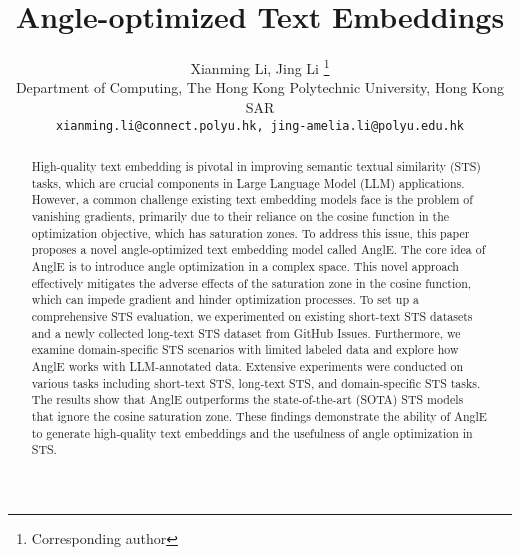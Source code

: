 \documentclass{article} \usepackage{iclr2024_conference,times}
\title{Angle-optimized Text Embeddings}
\author{Xianming Li, Jing Li \thanks{Corresponding author} \\
Department of Computing, The Hong Kong Polytechnic University, Hong Kong SAR \\
\texttt{xianming.li@connect.polyu.hk, jing-amelia.li@polyu.edu.hk}
}
\begin{document}
\maketitle

\begin{abstract}
High-quality text embedding is pivotal in improving semantic textual similarity (STS) tasks, which are crucial components in Large Language Model (LLM) applications. 
However, a common challenge existing text embedding models face is the problem of vanishing gradients, primarily due to their reliance on the cosine function in the optimization objective, which has saturation zones. 
To address this issue, this paper proposes a novel angle-optimized text embedding model called AnglE.
The core idea of AnglE is to introduce angle optimization in a complex space. This novel approach effectively mitigates the adverse effects of the saturation zone in the cosine function, which can impede gradient and hinder optimization processes. 
To set up a comprehensive STS evaluation, we experimented on existing short-text STS datasets and a newly collected long-text STS dataset from GitHub Issues. 
Furthermore, we examine domain-specific STS scenarios with limited labeled data and explore how AnglE works with LLM-annotated data.
Extensive experiments were conducted on various tasks including short-text STS, long-text STS, and domain-specific STS tasks.
The results show that AnglE outperforms the state-of-the-art (SOTA) STS models that ignore the cosine saturation zone.  
These findings demonstrate the ability of AnglE to generate high-quality text embeddings and the usefulness of angle optimization in STS.
\end{abstract}
\end{document}
